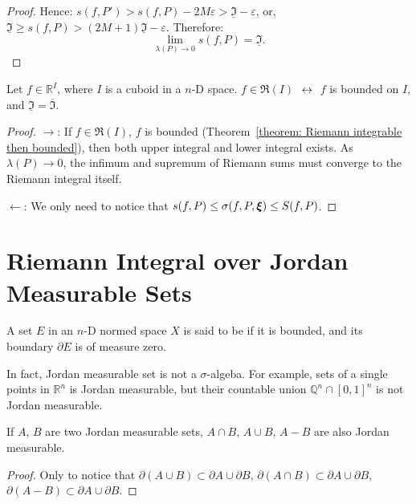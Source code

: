 \documentclass[openany]{book}
\begin{document}
\begin{proof}
	Hence: $s(f, P') > s(f, P) - 2M \varepsilon > \underline{\mathfrak I} - \varepsilon$, or, $\underline{\mathfrak I} \geq s(f, P) > (2M + 1)\underline{\mathfrak I} - \varepsilon$. 
	Therefore:
	\begin{equation*}
		\lim_{\lambda(P) \to 0} s(f, P) = \underline{\mathfrak I}.
	\end{equation*}
\end{proof}

\begin{theorem}
	\label{theorem: Darboux's criterion}
	Let $f \in \mathbb R^I$, where $I$ is a cuboid in a $n$-D space.
	$f \in \mathfrak R(I)$ $\;\leftrightarrow\;$ $f$ is bounded on $I$, and $\underline{\mathfrak I} = \overline{\mathfrak I}$.
\end{theorem}
\begin{proof}
	$\to$: If $f \in \mathfrak R(I)$, $f$ is bounded (Theorem~\ref{theorem: Riemann integrable then bounded}), then both upper integral and lower integral exists. 
	As $\lambda(P) \to 0$, the infimum and supremum of Riemann sums must converge to the Riemann integral itself.

	$\gets$: We only need to notice that $s(f, P) \leq \sigma(f, P, \boldsymbol{\xi}) \leq S(f, P)$.
\end{proof}

\section{Riemann Integral over Jordan Measurable Sets}

\begin{definition}
	A set $E$ in an $n$-D normed space $X$ is said to be  if it is bounded, and its boundary $\partial E$ is of measure zero.
\end{definition}

In fact, Jordan measurable set is not a $\sigma$-algeba. 
For example, sets of a single points in $\mathbb R^n$ is Jordan measurable, but their countable union $\mathbb Q^n \cap [0, 1]^n$ is not Jordan measurable.

\begin{lemma}
	\label{lemma: Jordan measurable sets is closed under finite union, finite intersection and difference}
	If $A$, $B$ are two Jordan measurable sets, $A \cap B$, $A \cup B$, $A - B$ are also Jordan measurable.
\end{lemma}
\begin{proof}
	Only to notice that $\partial(A \cup B) \subset \partial A \cup \partial B$, $\partial(A \cap B) \subset \partial A \cup \partial B$, $\partial(A - B) \subset \partial A \cup \partial B$.
\end{proof}
\end{document}
